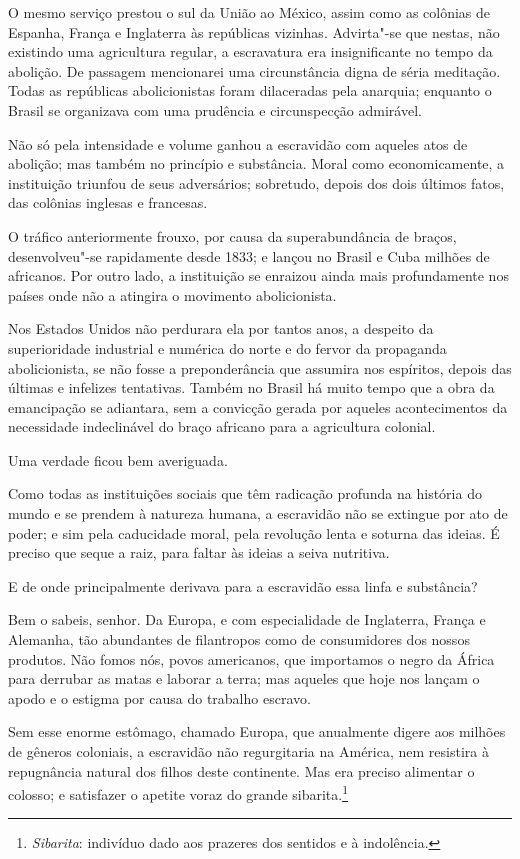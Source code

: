 \begin{linenumbers}
O mesmo serviço prestou o sul da União ao México, assim como as colônias
de Espanha, França e Inglaterra às repúblicas vizinhas. Advirta"-se
que nestas, não existindo uma agricultura regular, a escravatura era
insignificante no tempo da abolição. De passagem mencionarei uma
circunstância digna de séria meditação. Todas as repúblicas
abolicionistas foram dilaceradas pela anarquia; enquanto o Brasil se
organizava com uma prudência e circunspecção admirável. 

Não só pela intensidade e volume ganhou a escravidão com aqueles atos de
abolição; mas também no princípio e substância. Moral como
economicamente, a instituição triunfou de seus adversários; sobretudo,
depois dos dois últimos fatos, das colônias inglesas e francesas.

O tráfico anteriormente frouxo, por causa da superabundância de braços,
desenvolveu"-se rapidamente desde 1833; e lançou no Brasil e Cuba
milhões de africanos. Por outro lado, a instituição se enraizou ainda
mais profundamente nos países onde não a atingira o movimento abolicionista.

Nos Estados Unidos não perdurara ela por tantos anos, a despeito da
superioridade industrial e numérica do norte e do fervor da propaganda
abolicionista, se não fosse a preponderância que assumira nos
espíritos, depois das últimas e infelizes tentativas. Também no Brasil
há muito tempo que a obra da emancipação se adiantara, sem a convicção
gerada por aqueles acontecimentos da necessidade indeclinável do braço
africano para a agricultura colonial.

Uma verdade ficou bem averiguada.

Como todas as instituições sociais que têm radicação profunda na
história do mundo e se prendem à natureza humana, a escravidão não se
extingue por ato de poder; e sim pela caducidade moral, pela revolução
lenta e soturna das ideias. É preciso que seque a raiz, para faltar às
ideias a seiva nutritiva.

E de onde principalmente derivava para a escravidão essa linfa e substância?

Bem o sabeis, senhor. Da Europa, e com especialidade de Inglaterra,
França e Alemanha, tão abundantes de filantropos como de consumidores
dos nossos produtos. Não fomos nós, povos americanos, que importamos o
negro da África para derrubar as matas e laborar a terra; mas aqueles
que hoje nos lançam o apodo e o estigma por causa do trabalho escravo.

Sem esse enorme estômago, chamado Europa, que anualmente digere aos
milhões de gêneros coloniais, a escravidão não regurgitaria na América,
nem resistira à repugnância natural dos filhos deste continente. Mas
era preciso alimentar o colosso; e satisfazer o apetite voraz do grande
sibarita.\footnote{ \textit{Sibarita}: indivíduo dado aos prazeres dos sentidos e à indolência.}
 


\end{linenumbers}
